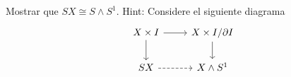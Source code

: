 \begin{ejercicio}
\label{eje:SX cong S wedge S1}
    Mostrar que $SX\cong S\wedge S^1$. Hint: Considere el siguiente diagrama
    \begin{equation*}
        \begin{tikzcd}
            X\times I\arrow[r]\arrow[d] & X\times I/\partial I\arrow[d]\\
            SX\arrow[r,dashed] & X\wedge S^1
        \end{tikzcd}
    \end{equation*}
\end{ejercicio}

\begin{demostracion}

\end{demostracion}
